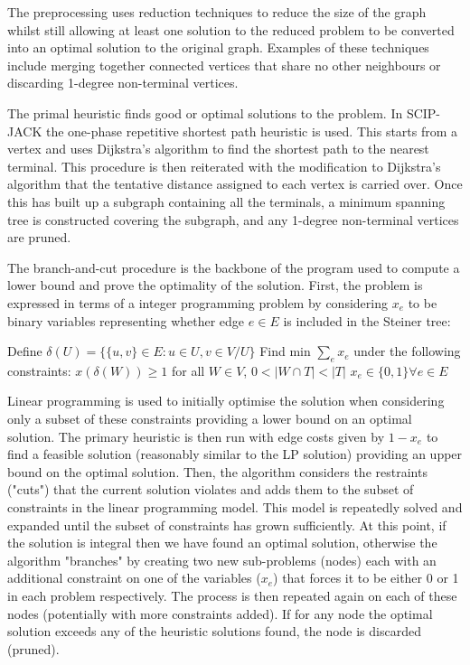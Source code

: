 \documentclass[pdftex,pra,aps,twocolumn,twoside]{revtex4-1}
\theoremstyle{plain}
\theoremstyle{note}
\newcommand\+{{\footnotesize \raisebox{0.3ex}{+}}}
\begin{document}
The preprocessing uses reduction techniques to reduce the size of the graph whilst still allowing at least one solution to the reduced problem to be converted into an optimal solution to the original graph. Examples of these techniques include merging together connected vertices that share no other neighbours or discarding 1-degree non-terminal vertices.

The primal heuristic finds good or optimal solutions to the problem. In SCIP-JACK the one-phase repetitive shortest path heuristic \cite{aragao2002implementation} is used. This starts from a vertex and uses Dijkstra’s algorithm \cite{dijkstra2022note} to find the shortest path to the nearest terminal. This procedure is then reiterated with the modification to Dijkstra’s algorithm that the tentative distance assigned to each vertex is carried over. Once this has built up a subgraph containing all the terminals, a minimum spanning tree is constructed covering the subgraph, and any 1-degree non-terminal vertices are pruned.

The branch-and-cut procedure is the backbone of the program used to compute a lower bound and prove the optimality of the solution. First, the problem is expressed in terms of a integer programming problem by considering $x_e$ to be binary variables representing whether edge $e \in E$ is included in the Steiner tree:

\begin{algorithm}
\caption*{\label{alg:steinerTreeCut}\textsc{Steiner Tree Problem Undirected Cut Formulation}}
\begin{algorithmic}[1]
\Statex Define $\delta (U) =\{\{u,v\} \in E: u \in U, v \in V/U \}$
\Statex
\Statex Find min $\sum_e x_e$ under the following constraints:
\State $x(\delta (W)) \geq 1$ for all $W \in V$, $0 < |W \cap T| < |T|$
\State $x_e \in \{0,1\} \forall e \in E$
\end{algorithmic}
\end{algorithm}

Linear programming is used to initially optimise the solution when considering only a subset of these constraints providing a lower bound on an optimal solution. The primary heuristic is then run with edge costs given by $1-x_e$ to find a feasible solution (reasonably similar to the LP solution) providing an upper bound on the optimal solution. Then, the algorithm considers the restraints ("cuts") that the current solution violates and adds them to the subset of constraints in the linear programming model. This model is repeatedly solved and expanded until the subset of constraints has grown sufficiently. At this point, if the solution is integral then we have found an optimal solution, otherwise the algorithm "branches" by creating two new sub-problems (nodes) each with an additional constraint on one of the variables ($x_e$) that forces it to be either 0 or 1 in each problem respectively. The process is then repeated again on each of these nodes (potentially with more constraints added). If for any node the optimal solution exceeds any of the heuristic solutions found, the node is discarded (pruned).
\end{document}
